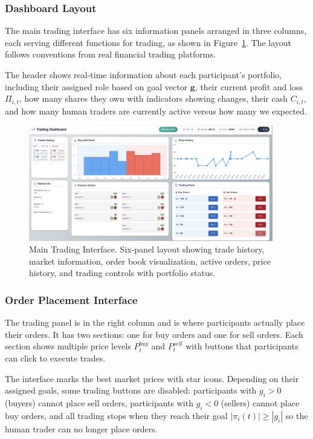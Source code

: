 \subsubsection{Dashboard Layout}

The main trading interface has six information panels arranged in three columns, each serving different functions for trading, as shown in Figure~\ref{fig:dashboard}. The layout follows conventions from real financial trading platforms.

The header shows real-time information about each participant's portfolio, including their assigned role based on goal vector $\mathbf{g}$, their current profit and loss $\Pi_{i,t}$, how many shares they own with indicators showing changes, their cash $C_{i,t}$, and how many human traders are currently active versus how many we expected.

\begin{figure}[!htbp]
\centering
\includegraphics[width=0.95\textwidth]{figs/trading-dashboard.png}
\caption{Main Trading Interface. Six-panel layout showing trade history, market information, order book visualization, active orders, price history, and trading controls with portfolio status.}
\label{fig:dashboard}
\end{figure}

\subsubsection{Order Placement Interface}

The trading panel is in the right column and is where participants actually place their orders. It has two sections: one for buy orders and one for sell orders. Each section shows multiple price levels $P_t^{buy}$ and $P_t^{sell}$ with buttons that participants can click to execute trades.

The interface marks the best market prices with star icons. Depending on their assigned goals, some trading buttons are disabled: participants with $g_i > 0$ (buyers) cannot place sell orders, participants with $g_i < 0$ (sellers) cannot place buy orders, and all trading stops when they reach their goal $|\pi_i(t)| \geq |g_i|$ so the human trader can no longer place orders.

